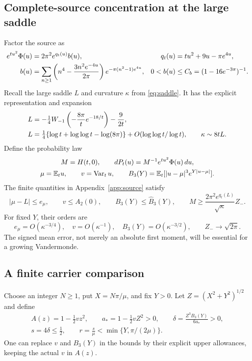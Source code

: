 \subsection{Complete-source concentration at the large saddle}
Factor the source as
\begin{align}
 e^{tu^2}\Phi(u)&=2\pi^2e^{q_t(u)}b(u),&
 q_t(u)&=tu^2+9u-\pi e^{4u},\label{eq:q}\\
 b(u)&=\sum_{n\ge1}
  \left(n^4-\frac{3n^2e^{-4u}}{2\pi}\right)
  e^{-\pi(n^2-1)e^{4u}},&
 0<b(u)&\le C_b=(1-16e^{-3\pi})^{-1}.\notag
\end{align}
Recall the large saddle $L$ and curvature $\kappa$ from
\eqref{eq:saddle}.
It has the explicit representation and expansion
\begin{align}
 L&=-\tfrac14W_{-1}\left(-\frac{8\pi}{t}e^{-18/t}\right)
       -\frac9{2t},\label{eq:Lambert}\\
 L&=\tfrac14\{\log t+\log\log t-\log(8\pi)\}
       +O(\log\log t/\log t),\qquad \kappa\sim8tL .\notag
\end{align}
Define the probability law
\begin{gather*}
 M=H(t,0),\qquad dP_t(u)=M^{-1}e^{tu^2}\Phi(u)\,du,\\
 \mu=\mathbb E_tu,\qquad v=\operatorname{Var}_tu,\qquad
 B_3(Y)=\mathbb E_t[|u-\mu|^3e^{Y|u-\mu|}].
\end{gather*}
The finite quantities in Appendix~\ref{app:source} satisfy
\begin{equation}
 |\mu-L|\le e_\mu,\qquad v\le A_2(0),\qquad
 B_3(Y)\le\widehat B_3(Y),\qquad
 M\ge \frac{2\pi^2e^{q_t(L)}}{\sqrt\kappa}Z_- .
 \label{eq:momentbounds}
\end{equation}
For fixed $Y$, their orders are
\begin{equation}
 e_\mu=O(\kappa^{-3/4}),\quad
 v=O(\kappa^{-1}),\quad
 B_3(Y)=O(\kappa^{-3/2}),\qquad Z_-\longrightarrow\sqrt{2\pi}.
 \label{eq:momentorders}
\end{equation}
The signed mean error, not merely an absolute first moment,
will be essential for a growing Vandermonde.

\subsection{A finite carrier comparison}
Choose an integer $N\ge1$, put $X=N\pi/\mu$, and fix $Y>0$.
Let $Z=(X^2+Y^2)^{1/2}$ and define
\begin{equation}
 \begin{gathered}
 A(z)=1-\tfrac12vz^2,\qquad
 a_*=1-\tfrac12vZ^2>0,\qquad
 \delta=\frac{Z^3B_3(Y)}{6a_*}>0,\\
 s=4\delta\le\tfrac12,\qquad
 r=\frac{s}{\mu}<\min\{Y,\pi/(2\mu)\}.
 \end{gathered}
 \label{eq:carriergates}
\end{equation}
One can replace $v$ and $B_3(Y)$ in the bounds by their explicit
upper allowances, keeping the actual $v$ in $A(z)$.

